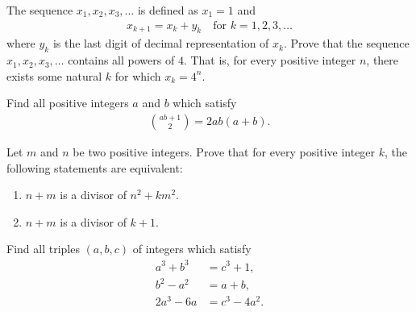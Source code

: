 \documentclass[problems.tex]{subfile}
\begin{document}
	
	
	\begin{problem}
		The sequence $x_1, x_2, x_3, \dots$ is defined as $x_1 = 1$ and
		\begin{align*}
			x_{k+1} = x_k + y_k \quad \text{for } k=1, 2, 3, \dots
		\end{align*}
		where $y_k$ is the last digit of decimal representation of $x_k$. Prove that the sequence $x_1, x_2, x_3, \dots$ contains all powers of $4$. That is, for every positive integer $n$, there exists some natural $k$ for which $x_k=4^n$.
	\end{problem}
	
	
	\begin{problem}
		Find all positive integers $a$ and $b$ which satisfy
		\begin{align*}
			\binom{ab+1}{2} = 2ab(a+b).
		\end{align*}
	\end{problem}
	
	
	\begin{problem}
		Let $m$ and $n$ be two positive integers. Prove that for every positive integer $k$, the following statements are equivalent:
		\begin{enumerate}
			\item $n+m$ is a divisor of $n^2+km^2$.
			\item $n+m$ is a divisor of $k+1$.
		\end{enumerate}
	\end{problem}
	
	
	
	
	\begin{problem}
		Find all triples $(a, b, c)$ of integers which satisfy
		\begin{align*}
			a^3 + b^3 &= c^3 + 1,\\
			b^2 - a^2 &= a + b,\\
			2a^3-6a   &= c^3 - 4a^2.
		\end{align*}
	\end{problem}
	
\end{document}
